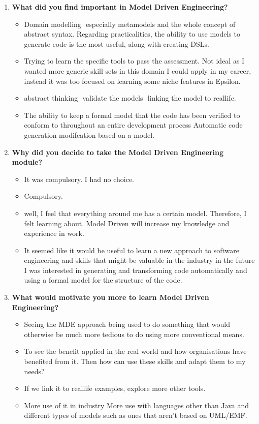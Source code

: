 \documentclass[12pt, a4paper]{report}
\begin{document}
{\begin{appendices}
\begin{enumerate}
\item \textbf{What did you find important in Model­ Driven Engineering?}
\begin{itemize}
\item Domain modelling ­ especially metamodels and the whole concept of abstract syntax. Regarding practicalities, the ability to use models to generate code is the most useful, along with creating DSLs.
\item Trying to learn the specific tools to pass the assessment. Not ideal as I wanted more generic
skill sets in this domain I could apply in my career, instead it was too focused on learning some niche features in Epsilon.
\item abstract thinking ­ validate the models ­ linking the model to real­life.
\item The ability to keep a formal model that the code has been verified to conform to throughout
an entire development process Automatic code generation modifcation based on a model.
\end{itemize}

\item \textbf{ Why did you decide to take the Model ­Driven Engineering module?}
\begin{itemize}
\item It was compulsory. I had no choice.
\item Compulsory.
\item well, I feel that everything around me has a certain model. Therefore, I felt learning about. Model­ Driven will increase my knowledge and experience in work. 
\item It seemed like it would be useful to learn a new approach to software engineering and skills that might be valuable in the industry in the future I was interested in generating and transforming code automatically and using a formal model for the structure of the code.
\end{itemize}


\item \textbf{ What would motivate you more to learn Model Driven Engineering?}
\begin{itemize}
\item Seeing the MDE approach being used to do something that would otherwise be much more tedious to do using more conventional means.
\item To see the benefit applied in the real world and how organisations have benefited from it. Then how can use these skills and adapt them to my needs?
\item If we link it to real­life examples, explore more other tools.
\item More use of it in industry More use with languages other than Java and different types of models such as ones that aren't based on UML/EMF.
\end{itemize}


\end{enumerate}
\end{appendices}}
\end{document}
